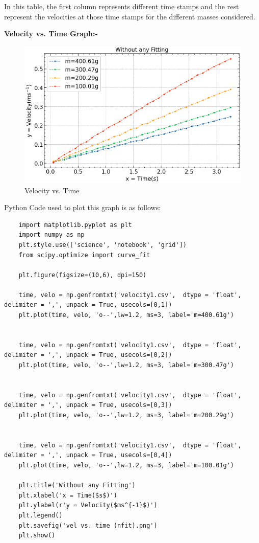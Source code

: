 \documentclass{article}
\begin{document}
 	In this table, the first column represents different time stamps and the rest represent the velocities at those time stamps for the different masses considered.
 
 	\textbf{Velocity vs. Time Graph:-}
 	
 	\begin{figure}[H]
 		\centering
 		\includegraphics[scale=0.7]{vel vs. time (nfit).png}
 		\caption{Velocity vs. Time}
 		\label{figure:velnf}%
 	\end{figure}
 
 Python Code used to plot this graph is as follows:
 
 \begin{lstlisting}
 	import matplotlib.pyplot as plt
 	import numpy as np
 	plt.style.use(['science', 'notebook', 'grid'])
 	from scipy.optimize import curve_fit
 	
 	plt.figure(figsize=(10,6), dpi=150)
 	
 	time, velo = np.genfromtxt('velocity1.csv',  dtype = 'float', delimiter = ',', unpack = True, usecols=[0,1])
 	plt.plot(time, velo, 'o--',lw=1.2, ms=3, label='m=400.61g')
 	
 	
 	time, velo = np.genfromtxt('velocity1.csv',  dtype = 'float', delimiter = ',', unpack = True, usecols=[0,2])
 	plt.plot(time, velo, 'o--',lw=1.2, ms=3, label='m=300.47g')
 	
 	
 	time, velo = np.genfromtxt('velocity1.csv',  dtype = 'float', delimiter = ',', unpack = True, usecols=[0,3])
 	plt.plot(time, velo, 'o--',lw=1.2, ms=3, label='m=200.29g')
 	
 	
 	time, velo = np.genfromtxt('velocity1.csv',  dtype = 'float', delimiter = ',', unpack = True, usecols=[0,4])
 	plt.plot(time, velo, 'o--',lw=1.2, ms=3, label='m=100.01g')
 	
 	plt.title('Without any Fitting')
 	plt.xlabel('x = Time($s$)')
 	plt.ylabel(r'y = Velocity($ms^{-1}$)')
 	plt.legend()
 	plt.savefig('vel vs. time (nfit).png')
 	plt.show()
 \end{lstlisting}
\end{document}
